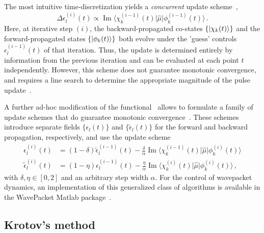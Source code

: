 \documentclass[submission, Phys]{SciPost}
\newcommand{\Op}[1]{\hat{#1}}
\renewcommand{\Im}[0]{\operatorname{Im}}
\begin{document}
The most intuitive time-discretization yields a \emph{concurrent} update
scheme~\cite{Tannor91,Tannor92,SomloiCP1993},
\begin{equation}
  \label{eq:concurrent_update}
  \Delta \epsilon_l^{(i)}(t) \propto
    \Im \big\langle
    \chi_k^{(i-1)}(t)
    \big\vert
    \Op{\mu}
    \big\vert
    \phi_k^{(i-1)}(t)
    \big\rangle\,.
\end{equation}
Here, at iterative step $(i)$, the backward-propagated co-states
$\{\ket{\chi_k(t)}\}$ and the forward-propagated states  $\{\ket{\phi_k(t)}\}$
both evolve under the 'guess' controls $\epsilon^{(i-1)}_l(t)$ of that
iteration.
Thus, the update is determined entirely by information from the previous
iteration and can be evaluated at each point $t$ independently.
However, this scheme does not guarantee monotonic convergence, and requires a
line search to determine the appropriate magnitude of the pulse
update~\cite{Tannor91}.

A further ad-hoc modification of the functional~\cite{ZhuJCP98} allows to
formulate a family of update schemes that do guarantee monotonic
convergence~\cite{MadayJCP2003,OhtsukiJCP2004}.
These schemes introduce separate fields $\{\epsilon_l(t)\}$ and
$\{\tilde\epsilon_l(t)\}$ for the  forward and backward propagation,
respectively, and use the update scheme~\cite{WerschnikJPB2007}
\begin{subequations}
  \label{eq:zhu_rabitz_update}
  \begin{align}
    \epsilon_l^{(i)}(t)
      & = (1-\delta) \tilde\epsilon_l^{(i-1)}(t) - \frac{\delta}{\alpha}
      \Im \big\langle
        \chi_k^{(i-1)}(t)
        \big\vert
        \Op{\mu}
        \big\vert
        \phi_k^{(i)}(t)
        \big\rangle \\
    \tilde\epsilon_l^{(i)}(t)
      & = (1-\eta) \epsilon_l^{(i-1)}(t) - \frac{\eta}{\alpha}
      \Im \big\langle
        \chi_k^{(i)}(t)
        \big\vert
        \Op{\mu}
        \big\vert
        \phi_k^{(i)}(t)
        \big\rangle\,,
  \end{align}
\end{subequations}
with $\delta, \eta \in [0, 2]$  and an arbitrary step width $\alpha$.
For the control of wavepacket dynamics, an implementation of this generalized
class of algorithms is available in the WavePacket Matlab
package~\cite{SchmidtCPC2018}.

\subsection{Krotov's method}%
\label{sec:comparison_krotov}
\end{document}
